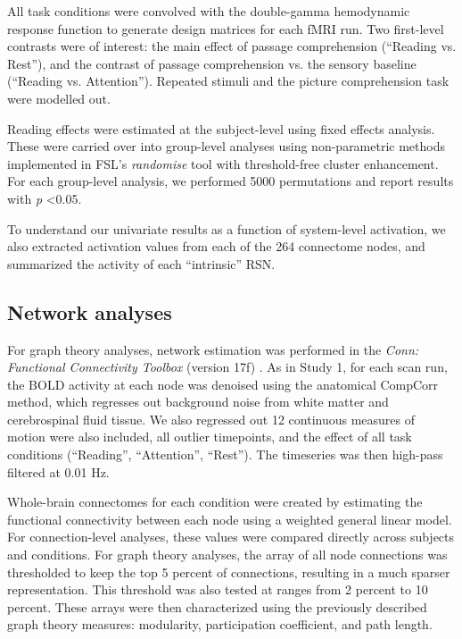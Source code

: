 All task conditions were convolved with the double-gamma hemodynamic response function to generate design matrices for each fMRI run. Two first-level contrasts were of interest: the main effect of passage comprehension (``Reading vs. Rest''), and the contrast of passage comprehension vs. the sensory baseline (``Reading vs. Attention''). Repeated stimuli and the picture comprehension task were modelled out.

Reading effects were estimated at the subject-level using fixed effects analysis. These were carried over into group-level analyses using non-parametric methods implemented in FSL’s \textit{randomise} tool with threshold-free cluster enhancement. For each group-level analysis, we performed 5000 permutations and report results with \textit{p} \textless 0.05. 

To understand our univariate results as a function of system-level activation, we also extracted activation values from each of the 264 connectome nodes, and summarized the activity of each ``intrinsic'' RSN.

\subsection{Network analyses}

For graph theory analyses, network estimation was performed in the \textit{Conn: Functional Connectivity Toolbox} (version 17f) \citep{WhitfieldGabrieli2012}. As in Study 1, for each scan run, the BOLD activity at each node was denoised using the anatomical CompCorr method, which regresses out background noise from white matter and cerebrospinal fluid tissue. We also regressed out 12 continuous measures of motion were also included, all outlier timepoints, and the effect of all task conditions (``Reading'', ``Attention'', ``Rest''). The timeseries was then high-pass filtered at 0.01 Hz.

Whole-brain connectomes for each condition were created by estimating the functional connectivity between each node using a weighted general linear model. For connection-level analyses, these values were compared directly across subjects and conditions. For graph theory analyses, the array of all node connections was thresholded to keep the top 5 percent of connections, resulting in a much sparser representation. This threshold was also tested at ranges from 2 percent to 10 percent. These arrays were then characterized using the previously described graph theory measures: modularity, participation coefficient, and path length.

